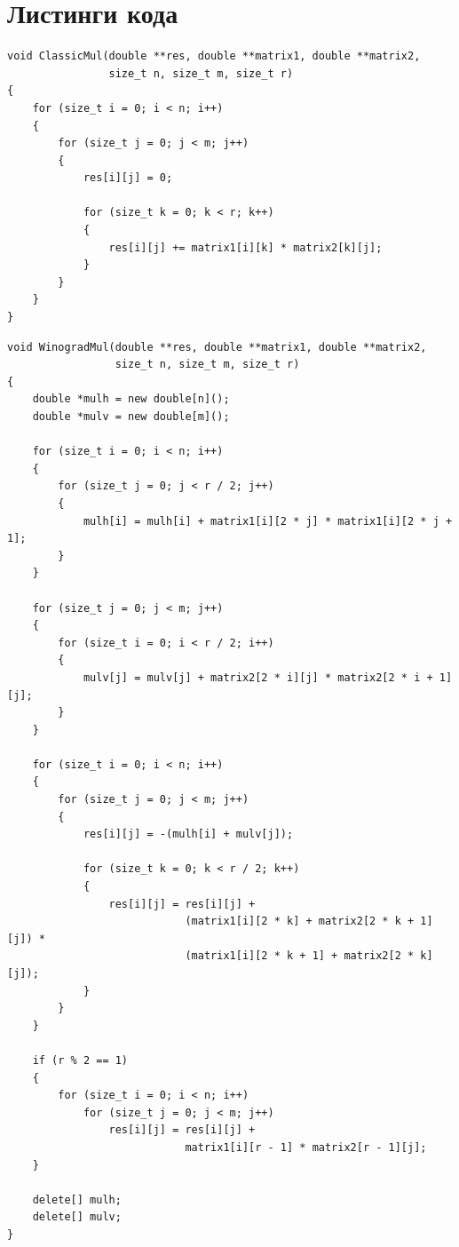 \section{Листинги кода}

\noindent\begin{minipage}{\textwidth}
\begin{lstlisting}[caption=Классический алгоритм]
void ClassicMul(double **res, double **matrix1, double **matrix2,
                size_t n, size_t m, size_t r)
{
    for (size_t i = 0; i < n; i++)
    {
        for (size_t j = 0; j < m; j++)
        {
            res[i][j] = 0;

            for (size_t k = 0; k < r; k++)
            {
                res[i][j] += matrix1[i][k] * matrix2[k][j];
            }
        }
    }
}
\end{lstlisting}
\end{minipage}

\begin{lstlisting}[caption=Алгоритм Винограда]
void WinogradMul(double **res, double **matrix1, double **matrix2,
                 size_t n, size_t m, size_t r)
{
    double *mulh = new double[n]();
    double *mulv = new double[m]();

    for (size_t i = 0; i < n; i++)
    {
        for (size_t j = 0; j < r / 2; j++)
        {
            mulh[i] = mulh[i] + matrix1[i][2 * j] * matrix1[i][2 * j + 1];
        }
    }

    for (size_t j = 0; j < m; j++)
    {
        for (size_t i = 0; i < r / 2; i++)
        {
            mulv[j] = mulv[j] + matrix2[2 * i][j] * matrix2[2 * i + 1][j];
        }
    }

    for (size_t i = 0; i < n; i++)
    {
        for (size_t j = 0; j < m; j++)
        {
            res[i][j] = -(mulh[i] + mulv[j]);

            for (size_t k = 0; k < r / 2; k++)
            {
                res[i][j] = res[i][j] +
                            (matrix1[i][2 * k] + matrix2[2 * k + 1][j]) *
                            (matrix1[i][2 * k + 1] + matrix2[2 * k][j]);
            }
        }
    }

    if (r % 2 == 1)
    {
        for (size_t i = 0; i < n; i++)
            for (size_t j = 0; j < m; j++)
                res[i][j] = res[i][j] +
                            matrix1[i][r - 1] * matrix2[r - 1][j];
    }

    delete[] mulh;
    delete[] mulv;
}
\end{lstlisting}

